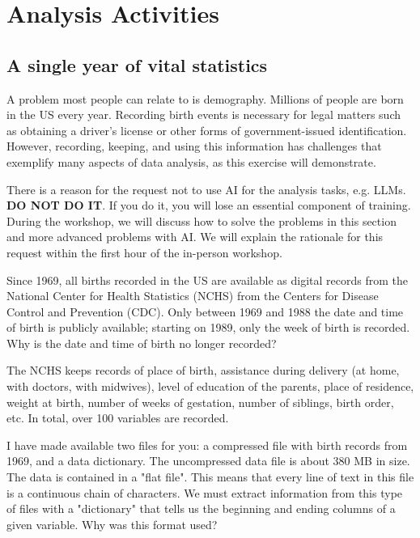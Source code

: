 \chapter{Analysis Activities}
\label{ch:analysis-activities}

\section{A single year of vital statistics}

A problem most people can relate to is demography. Millions of people are born in the US every year. Recording birth events is necessary for legal matters such as obtaining a driver's license or other forms of government-issued identification. However, recording, keeping, and using this information has challenges that exemplify many aspects of data analysis, as this exercise will demonstrate.

\begin{warningbox}[title=DO NOT USE ANY FORM OF AI HERE]
There is a reason for the request not to use AI for the analysis tasks, e.g. LLMs. \textbf{DO NOT DO IT}. If you do it, you will lose an essential component of training. During the workshop, we will discuss how to solve the problems in this section and more advanced problems with AI. We will explain the rationale for this request within the first hour of the in-person workshop.
\end{warningbox}



Since 1969, all births recorded in the US are available as digital records from the National Center for Health Statistics (NCHS) from the Centers for Disease Control and Prevention (CDC). Only between 1969 and 1988 the date and time of birth is publicly available; starting on 1989, only the week of birth is recorded. Why is the date and time of birth no longer recorded? \QA


The NCHS keeps records of place of birth, assistance during delivery (at home, with doctors, with midwives), level of education of the parents, place of residence, weight at birth, number of weeks of gestation, number of siblings, birth order, etc. In total, over 100 variables are recorded.

I have made available two files for you: a compressed file with birth records from 1969, and a data dictionary. The uncompressed data file is about 380 MB in size. The data is contained in a "flat file". This means that every line of text in this file is a continuous chain of characters. We must extract information from this type of files with a "dictionary" that tells us the beginning and ending columns of a given variable. Why was this format used? \QA


